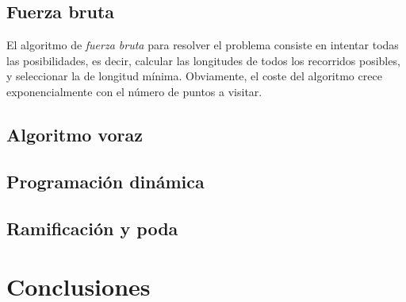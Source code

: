 \documentclass{article}
\begin{document}
\subsection{Fuerza bruta}
El algoritmo de \emph{fuerza bruta} para resolver el problema consiste en intentar todas las posibilidades, es decir, calcular las longitudes de todos los recorridos posibles, y seleccionar la de longitud mínima.
Obviamente, el coste del algoritmo crece exponencialmente con el número de puntos a visitar.



\subsection{Algoritmo voraz}


\subsection{Programación dinámica}


\subsection{Ramificación y poda}

\section{Conclusiones}

\printbibliography
\end{document}
